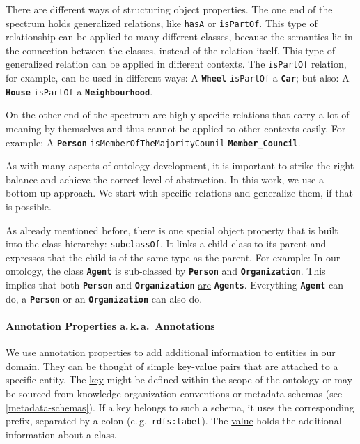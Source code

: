 \documentclass[a4paper, DIV=13, BCOR=0cm]{scrbook}
\newcommand{\eg}{e.\,g.\ }
\newcommand{\aka}{a.\,k.\,a.\ }
\newcommand{\class}[1]{\texttt{\textbf{#1}}}
\newcommand{\relation}[1]{\texttt{#1}}
\newcommand{\prop}[1]{\texttt{#1}}
\begin{document}
There are different ways of structuring object properties. The one end of the spectrum holds generalized relations, like \relation{hasA} or \relation{isPartOf}. This type of relationship can be applied to many different classes, because the semantics lie in the connection between the classes, instead of the relation itself. This type of generalized relation can be applied in different contexts. The \relation{isPartOf} relation, for example, can be used in different ways: A \class{Wheel} \relation{isPartOf} a \class{Car}; but also: A \class{House} \relation{isPartOf} a \class{Neighbourhood}.

On the other end of the spectrum are highly specific relations that carry a lot of meaning by themselves and thus cannot be applied to other contexts easily. For example: A \class{Person} \relation{isMemberOfTheMajorityCounil} \class{Member\_Council}.

As with many aspects of ontology development, it is important to strike the right balance and achieve the correct level of abstraction. In this work, we use a bottom-up approach. We start with specific relations and generalize them, if that is possible.

As already mentioned before, there is one special object property that is built into the class hierarchy: \relation{subclassOf}. It links a child class to its parent and expresses that the child is of the same type as the parent. For example: In our ontology, the class \class{Agent} is sub-classed by \class{Person} and \class{Organization}. This implies that both \class{Person} and \class{Organization} \underline{are} \class{Agents}. Everything \class{Agent} can do, a \class{Person} or an \class{Organization} can also do.

\paragraph{Annotation Properties \aka Annotations}
\label{annotation-properties}
We use annotation properties to add additional information to entities in our domain. They can be thought of simple key-value pairs that are attached to a specific entity. The \underline{key} might be defined within the scope of the ontology or may be sourced from knowledge organization conventions or metadata schemas (see \autoref{metadata-schemas}). If a key belongs to such a schema, it uses the corresponding prefix, separated by a colon (\eg \prop{rdfs:label}). The \underline{value} holds the additional information about a class.
\end{document}
